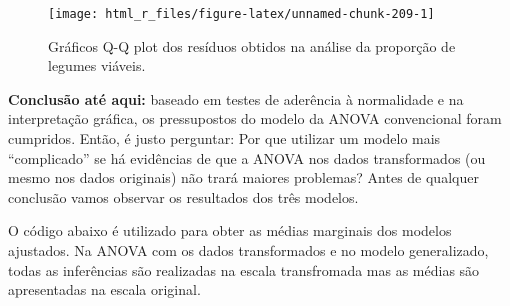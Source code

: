 \documentclass[
]{book}
\begin{document}
\begin{figure}

{\centering \texttt{[image: html\_r\_files/figure-latex/unnamed-chunk-209-1]} 

}

\caption{Gráficos Q-Q plot dos resíduos obtidos na análise da proporção de legumes viáveis.}\label{fig:unnamed-chunk-209}
\end{figure}

\begin{note}
\textbf{Conclusão até aqui:} baseado em testes de aderência à normalidade e na interpretação gráfica, os pressupostos do modelo da ANOVA convencional foram cumpridos. Então, é justo perguntar: Por que utilizar um modelo mais ``complicado'' se há evidências de que a ANOVA nos dados transformados (ou mesmo nos dados originais) não trará maiores problemas? Antes de qualquer conclusão vamos observar os resultados dos três modelos.
\end{note}

O código abaixo é utilizado para obter as médias marginais dos modelos ajustados. Na ANOVA com os dados transformados e no modelo generalizado, todas as inferências são realizadas na escala transfromada mas as médias são apresentadas na escala original.
\end{document}
